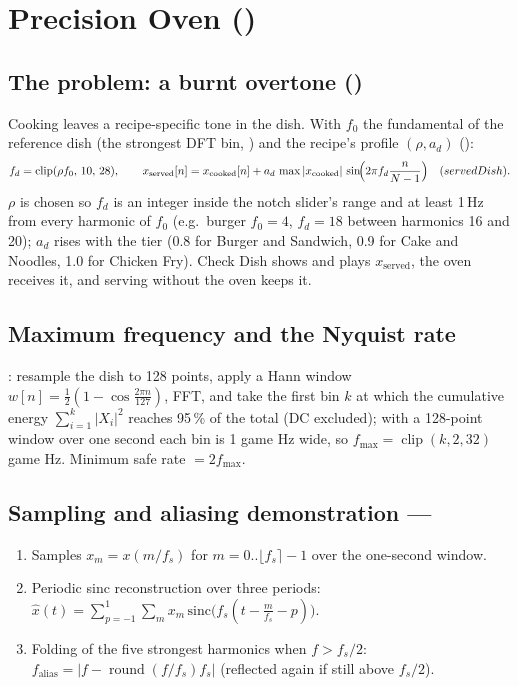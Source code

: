 \documentclass[11pt,a4paper]{article}
\begin{document}
\section{Precision Oven ()}
\subsection{The problem: a burnt overtone ()}
Cooking leaves a recipe-specific tone in the dish. With $f_0$ the fundamental of the
reference dish (the strongest DFT bin, ) and the recipe's profile
$(\rho,a_d)$ ():
\[
f_d=\operatorname{clip}(\rho f_0,\,10,\,28),\qquad
x_{\text{served}}[n]=x_{\text{cooked}}[n]+a_d\,\max|x_{\text{cooked}}|\,\sin\!\Bigl(2\pi f_d\frac{n}{N-1}\Bigr)
\quad(\fn{servedDish}).
\]
$\rho$ is chosen so $f_d$ is an integer inside the notch slider's range and at least 1\,Hz
from every harmonic of $f_0$ (e.g.\ burger $f_0=4$, $f_d=18$ between harmonics 16 and 20);
$a_d$ rises with the tier (0.8 for Burger and Sandwich, 0.9 for Cake and Noodles, 1.0 for Chicken Fry). Check Dish shows and plays
$x_{\text{served}}$, the oven receives it, and serving without the oven keeps it.

\subsection{Maximum frequency and the Nyquist rate}
: resample the dish to 128 points, apply a Hann window
$w[n]=\tfrac12(1-\cos\frac{2\pi n}{127})$, FFT, and take the first bin $k$ at which the
cumulative energy $\sum_{i=1}^{k}|X_i|^2$ reaches 95\,\% of the total (DC excluded);
with a 128-point window over one second each bin is 1 game Hz wide, so $f_{\max}=\operatorname{clip}(k,2,32)$ game Hz. Minimum safe
rate $=2f_{\max}$.

\subsection{Sampling and aliasing demonstration --- }
\begin{enumerate}
\item Samples $x_m=x(m/f_s)$ for $m=0..\lfloor f_s\rceil-1$ over the one-second window.
\item Periodic sinc reconstruction over three periods:
  $\hat x(t)=\sum_{p=-1}^{1}\sum_m x_m\,\mathrm{sinc}\bigl(f_s(t-\tfrac{m}{f_s}-p)\bigr)$.
\item Folding of the five strongest harmonics when $f>f_s/2$:
  $f_{\text{alias}}=|f-\operatorname{round}(f/f_s)f_s|$ (reflected again if still above $f_s/2$).
\end{enumerate}
\end{document}
